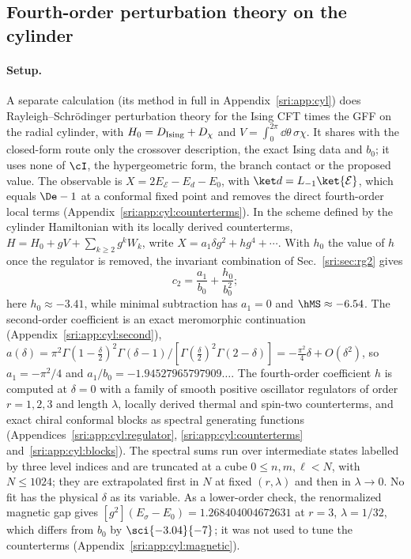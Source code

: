 \subsection{Fourth-order perturbation theory on the cylinder}\label{sri:sec:cyl}
\paragraph{Setup.} A separate calculation (its method in full in Appendix~\ref{sri:app:cyl}) does Rayleigh--Schr\"odinger
perturbation theory for the Ising CFT times the GFF on the radial cylinder, with $H_0=D_{\rm Ising}+D_\chi$ and $V=\int_0^{2\pi}\dd\theta\,\sigma\chi$. It shares
with the closed-form route only the crossover description, the exact Ising data and $b_0$; it uses none of $\cI$,
the hypergeometric form, the branch contact or the proposed value. The observable is
$X=2E_{\mathcal E}-E_d-E_0$, with $\ket d=L_{-1}\ket{\mathcal E}$, which equals $\De-1$ at a conformal fixed point and
removes the direct fourth-order local terms (Appendix~\ref{sri:app:cyl:counterterms}). In the scheme defined by the cylinder Hamiltonian with its locally
derived counterterms, $H=H_0+gV+\sum_{k\ge2}g^kW_k$, write $X=a_1\delta g^2+hg^4+\cdots$. With $h_0$ the value of $h$
once the regulator is removed, the invariant combination of Sec.~\ref{sri:sec:rg2} gives
\begin{equation}
 c_2=\frac{a_1}{b_0}+\frac{h_0}{b_0^2};
\end{equation}
here $h_0\approx-3.41$, while minimal subtraction has $a_1=0$ and $\hMS\approx-6.54$. The second-order coefficient is
an exact meromorphic continuation (Appendix~\ref{sri:app:cyl:second}),
$a(\delta)=\pi^2\Gamma(1-\frac\delta2)^2\Gamma(\delta-1)/[\Gamma(\frac\delta2)^2\Gamma(2-\delta)]=-\frac{\pi^2}4\delta+O(\delta^2)$,
so $a_1=-\pi^2/4$ and $a_1/b_0=-1.94527965797909\ldots$. The fourth-order coefficient $h$ is computed at $\delta=0$
with a family of smooth positive oscillator regulators of order $r=1,2,3$ and length $\lambda$, locally derived thermal
and spin-two counterterms, and exact chiral conformal blocks as spectral generating functions
(Appendices~\ref{sri:app:cyl:regulator}, \ref{sri:app:cyl:counterterms} and~\ref{sri:app:cyl:blocks}). The spectral sums run
over intermediate states labelled by three level indices and are truncated at a cube $0\le n,m,\ell<N$, with
$N\le1024$; they are extrapolated first in $N$ at fixed $(r,\lambda)$ and then in $\lambda\to0$. No fit has the
physical $\delta$ as its variable. As a lower-order check, the renormalized magnetic gap gives
$[g^2](E_\sigma-E_0)=1.268404004672631$ at $r=3$, $\lambda=1/32$, which differs from $b_0$ by $\sci{-3.04}{-7}$; it
was not used to tune the counterterms (Appendix~\ref{sri:app:cyl:magnetic}).

